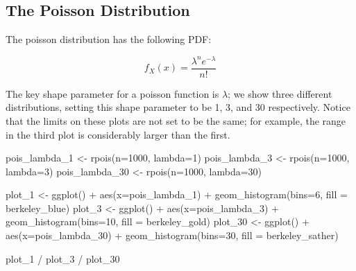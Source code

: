 \documentclass[
  letterpaper,
  DIV=11,
  numbers=noendperiod]{scrreprt}
\newenvironment{Shaded}{\begin{snugshade}}{\end{snugshade}}
\newcommand{\AttributeTok}[1]{\textcolor[rgb]{0.40,0.45,0.13}{#1}}
\newcommand{\DecValTok}[1]{\textcolor[rgb]{0.68,0.00,0.00}{#1}}
\newcommand{\FunctionTok}[1]{\textcolor[rgb]{0.28,0.35,0.67}{#1}}
\newcommand{\NormalTok}[1]{\textcolor[rgb]{0.00,0.23,0.31}{#1}}
\newcommand{\OtherTok}[1]{\textcolor[rgb]{0.00,0.23,0.31}{#1}}
\newcommand{\SpecialCharTok}[1]{\textcolor[rgb]{0.37,0.37,0.37}{#1}}
\begin{document}
\section{}\label{section}

\subsection{The Poisson Distribution}\label{the-poisson-distribution}

The poisson distribution has the following PDF:

\[
f_X(x) = \frac{\lambda^n e^{-\lambda}}{n!}
\]

The key shape parameter for a poisson function is \(\lambda\); we show
three different distributions, setting this shape parameter to be 1, 3,
and 30 respectively. Notice that the limits on these plots are not set
to be the same; for example, the range in the third plot is considerably
larger than the first.

\begin{Shaded}
\begin{Highlighting}[]
\NormalTok{pois\_lambda\_1  }\OtherTok{\textless{}{-}} \FunctionTok{rpois}\NormalTok{(}\AttributeTok{n=}\DecValTok{1000}\NormalTok{, }\AttributeTok{lambda=}\DecValTok{1}\NormalTok{)}
\NormalTok{pois\_lambda\_3  }\OtherTok{\textless{}{-}} \FunctionTok{rpois}\NormalTok{(}\AttributeTok{n=}\DecValTok{1000}\NormalTok{, }\AttributeTok{lambda=}\DecValTok{3}\NormalTok{)}
\NormalTok{pois\_lambda\_30 }\OtherTok{\textless{}{-}} \FunctionTok{rpois}\NormalTok{(}\AttributeTok{n=}\DecValTok{1000}\NormalTok{, }\AttributeTok{lambda=}\DecValTok{30}\NormalTok{)}

\NormalTok{plot\_1  }\OtherTok{\textless{}{-}} \FunctionTok{ggplot}\NormalTok{() }\SpecialCharTok{+} \FunctionTok{aes}\NormalTok{(}\AttributeTok{x=}\NormalTok{pois\_lambda\_1) }\SpecialCharTok{+} \FunctionTok{geom\_histogram}\NormalTok{(}\AttributeTok{bins=}\DecValTok{6}\NormalTok{, }\AttributeTok{fill =}\NormalTok{ berkeley\_blue)}
\NormalTok{plot\_3  }\OtherTok{\textless{}{-}} \FunctionTok{ggplot}\NormalTok{() }\SpecialCharTok{+} \FunctionTok{aes}\NormalTok{(}\AttributeTok{x=}\NormalTok{pois\_lambda\_3) }\SpecialCharTok{+} \FunctionTok{geom\_histogram}\NormalTok{(}\AttributeTok{bins=}\DecValTok{10}\NormalTok{, }\AttributeTok{fill =}\NormalTok{ berkeley\_gold)}
\NormalTok{plot\_30 }\OtherTok{\textless{}{-}} \FunctionTok{ggplot}\NormalTok{() }\SpecialCharTok{+} \FunctionTok{aes}\NormalTok{(}\AttributeTok{x=}\NormalTok{pois\_lambda\_30) }\SpecialCharTok{+} \FunctionTok{geom\_histogram}\NormalTok{(}\AttributeTok{bins=}\DecValTok{30}\NormalTok{, }\AttributeTok{fill =}\NormalTok{ berkeley\_sather)}

\NormalTok{plot\_1 }\SpecialCharTok{/}\NormalTok{ plot\_3 }\SpecialCharTok{/}\NormalTok{ plot\_30}
\end{Highlighting}
\end{Shaded}
\end{document}
